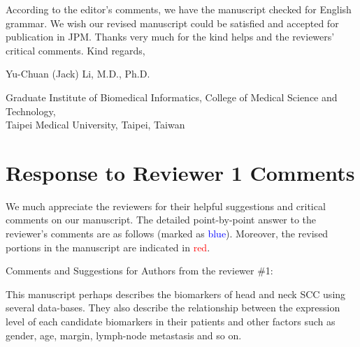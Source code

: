 \documentclass[preprint,12pt]{elsarticle}
\begin{document}
According to the editor's comments, we have the manuscript checked for English grammar. %
We wish our revised manuscript could be satisfied and accepted for publication in JPM. Thanks very much for the kind helps and the reviewers' critical comments.
Kind regards,

Yu-Chuan (Jack) Li, M.D., Ph.D.

Graduate Institute of Biomedical Informatics, 
College of Medical Science and Technology,\\
Taipei Medical University,
Taipei, Taiwan


\pagebreak

\section*{Response to Reviewer 1 Comments}
We much appreciate the reviewers for their helpful suggestions and critical comments on our manuscript. The detailed point-by-point answer to the reviewer's comments are as follows (marked as \textcolor{blue}{blue}). 
Moreover, the revised portions in the manuscript are indicated in \textcolor{red}{red}.

Comments and Suggestions for Authors from the reviewer \#1:

This manuscript perhaps describes the biomarkers of head and neck SCC using several data-bases. They also describe the relationship between the expression level of each candidate biomarkers in their patients and other factors such as gender, age, margin, lymph-node metastasis and so on.
\end{document}
